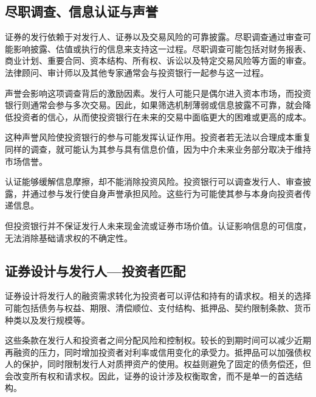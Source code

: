 \subsection[尽职调查、信息认证与声誉]{尽职调查、信息认证与声誉}

证券的发行依赖于对发行人、证券以及交易风险的可靠披露。尽职调查通过审查可能影响披露、估值或执行的信息来支持这一过程。尽职调查可能包括对财务报表、商业计划、重要合同、资本结构、所有权、诉讼以及特定交易风险等方面的审查。法律顾问、审计师以及其他专家通常会与投资银行一起参与这一过程。

声誉会影响这项调查背后的激励因素。发行人可能只是偶尔进入资本市场，而投资银行则通常会参与多次交易。因此，如果筛选机制薄弱或信息披露不可靠，就会降低投资者的信心，从而使投资银行在未来的交易中面临更大的困难或更高的成本。

这种声誉风险使投资银行的参与可能发挥认证作用。投资者若无法以合理成本重复同样的调查，就可能认为其参与具有信息价值，因为中介未来业务部分取决于维持市场信誉。


\begin{tcolorbox}[
  enhanced,
  breakable,
  colback=white,
  colframe=FinanceBlue,
  boxrule=0.7pt,
  sharp corners,
  borderline west={2.2pt}{0pt}{FinanceBlue},
  title=\textbf{财务展望：认证并不能保证成功},
  coltitle=white,
  colbacktitle=FinanceBlue,
  fonttitle=\bfseries,
  before skip=1.2em,
  after skip=1.2em
]

认证能够缓解信息摩擦，却不能消除投资风险。投资银行可以调查发行人、审查披露，并通过参与发行使自身声誉承担风险。这些行为可能使其参与本身向投资者传递信息。

但投资银行并不保证发行人未来现金流或证券市场价值。认证影响信息的可信度，无法消除基础请求权的不确定性。

\end{tcolorbox}

\subsection{证券设计与发行人—投资者匹配}

证券设计将发行人的融资需求转化为投资者可以评估和持有的请求权。相关的选择可能包括债务与权益、期限、清偿顺位、支付结构、抵押品、契约限制条款、货币种类以及发行规模等。

这些条款在发行人和投资者之间分配风险和控制权。较长的到期时间可以减少近期再融资的压力，同时增加投资者对利率或信用变化的承受力。抵押品可以加强债权人的保护，同时限制发行人对质押资产的使用。权益则避免了固定的债务偿还，但会改变所有权和请求权。因此，证券的设计涉及权衡取舍，而不是单一的首选结构。

